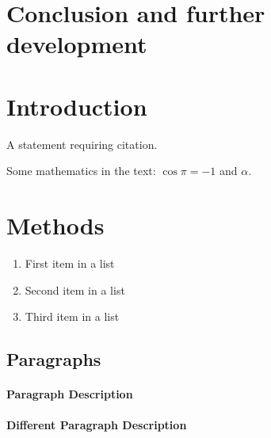 \documentclass[
12pt, %
a4paper, %
oneside, %
headinclude,footinclude, %
BCOR5mm, %
]{scrartcl}
\begin{document}
\section{Conclusion and further development}

\section{Introduction}

A statement requiring citation.

\lipsum[1-3] %

Some mathematics in the text: $\cos\pi=-1$ and $\alpha$.
 

\section{Methods}

\lipsum[5] %

\begin{enumerate}[noitemsep] %
\item First item in a list
\item Second item in a list
\item Third item in a list
\end{enumerate}


\subsection{Paragraphs}

\lipsum[6] %

\paragraph{Paragraph Description} \lipsum[7] %

\paragraph{Different Paragraph Description} \lipsum[8] %

\end{document}
